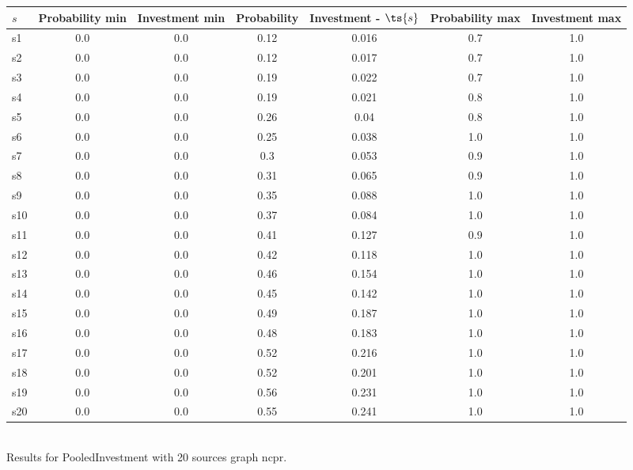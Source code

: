 \documentclass{article}
\begin{document}
\noindent\begin{tabular}{|l|c|c|c|c|c|c|}
\hline
$s$& Probability min & Investment min & Probability & Investment - $\ts{s}$ & Probability max & Investment max\\
\hline
s1 &0.0 & 0.0 & 0.12 & 0.016 & 0.7 & 1.0\\
\hline
s2 &0.0 & 0.0 & 0.12 & 0.017 & 0.7 & 1.0\\
\hline
s3 &0.0 & 0.0 & 0.19 & 0.022 & 0.7 & 1.0\\
\hline
s4 &0.0 & 0.0 & 0.19 & 0.021 & 0.8 & 1.0\\
\hline
s5 &0.0 & 0.0 & 0.26 & 0.04 & 0.8 & 1.0\\
\hline
s6 &0.0 & 0.0 & 0.25 & 0.038 & 1.0 & 1.0\\
\hline
s7 &0.0 & 0.0 & 0.3 & 0.053 & 0.9 & 1.0\\
\hline
s8 &0.0 & 0.0 & 0.31 & 0.065 & 0.9 & 1.0\\
\hline
s9 &0.0 & 0.0 & 0.35 & 0.088 & 1.0 & 1.0\\
\hline
s10 &0.0 & 0.0 & 0.37 & 0.084 & 1.0 & 1.0\\
\hline
s11 &0.0 & 0.0 & 0.41 & 0.127 & 0.9 & 1.0\\
\hline
s12 &0.0 & 0.0 & 0.42 & 0.118 & 1.0 & 1.0\\
\hline
s13 &0.0 & 0.0 & 0.46 & 0.154 & 1.0 & 1.0\\
\hline
s14 &0.0 & 0.0 & 0.45 & 0.142 & 1.0 & 1.0\\
\hline
s15 &0.0 & 0.0 & 0.49 & 0.187 & 1.0 & 1.0\\
\hline
s16 &0.0 & 0.0 & 0.48 & 0.183 & 1.0 & 1.0\\
\hline
s17 &0.0 & 0.0 & 0.52 & 0.216 & 1.0 & 1.0\\
\hline
s18 &0.0 & 0.0 & 0.52 & 0.201 & 1.0 & 1.0\\
\hline
s19 &0.0 & 0.0 & 0.56 & 0.231 & 1.0 & 1.0\\
\hline
s20 &0.0 & 0.0 & 0.55 & 0.241 & 1.0 & 1.0\\
\hline
\end{tabular}\\

\noindent Results for PooledInvestment with 20 sources graph ncpr.
\end{document}
